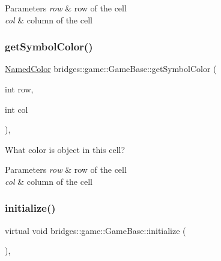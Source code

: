 \begin{DoxyParams}{Parameters}
{\em row} & row of the cell \\
\hline
{\em col} & column of the cell \\
\hline
\end{DoxyParams}
\mbox{\label{classbridges_1_1game_1_1_game_base_a26c9f9547cc6f992a829ce5d6edd8f85}} 
\subsubsection{\texorpdfstring{get\+Symbol\+Color()}{getSymbolColor()}}
{\footnotesize\ttfamily \hyperlink{namespacebridges_1_1game_afaa832a4322b25b6a4ebfba832f10f26}{Named\+Color} bridges\+::game\+::\+Game\+Base\+::get\+Symbol\+Color (\begin{DoxyParamCaption}\item[{int}]{row,  }\item[{int}]{col }\end{DoxyParamCaption})\hspace{0.3cm}{\ttfamily [inline]}, {\ttfamily [protected]}}



What color is object in this cell? 


\begin{DoxyParams}{Parameters}
{\em row} & row of the cell \\
\hline
{\em col} & column of the cell \\
\hline
\end{DoxyParams}
\mbox{\label{classbridges_1_1game_1_1_game_base_a9b6eb6fa7fceaac09d204b549164037f}} 
\subsubsection{\texorpdfstring{initialize()}{initialize()}}
{\footnotesize\ttfamily virtual void bridges\+::game\+::\+Game\+Base\+::initialize (\begin{DoxyParamCaption}{ }\end{DoxyParamCaption})\hspace{0.3cm}{\ttfamily [protected]}, {}}



